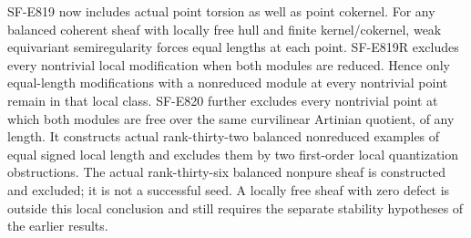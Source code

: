\documentclass[11pt]{article}
\theoremstyle{remark}\newtheorem{remark}[theorem]{Remark}
\begin{document}
SF-E819 now includes actual point torsion as well as point cokernel.
For any balanced coherent sheaf with locally free hull and finite
kernel/cokernel, weak equivariant semiregularity forces equal lengths
at each point. SF-E819R excludes every nontrivial local modification
when both modules are reduced. Hence only equal-length modifications
with a nonreduced module at every nontrivial point remain in that local
class. SF-E820 further excludes every nontrivial point at which both
modules are free over the same curvilinear Artinian quotient, of any
length. It constructs actual rank-thirty-two balanced nonreduced
examples of equal signed local length and excludes them by two
first-order local quantization obstructions. The actual rank-thirty-six balanced nonpure sheaf is constructed
and excluded; it is not a successful seed. A locally free sheaf with
zero defect is outside this local conclusion and still requires the
separate stability hypotheses of the earlier results.
\end{document}
